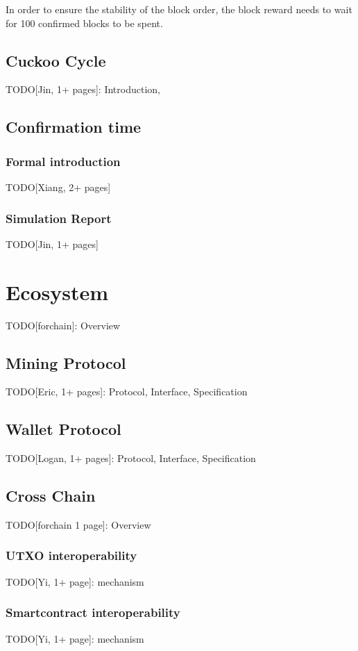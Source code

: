 \documentclass[a4paper,11pt]{article}
\begin{document}
In order to ensure the stability of the block order, the block reward needs to wait for 100 confirmed blocks to be spent.

\subsection{Cuckoo Cycle}
TODO[Jin, 1+ pages]: Introduction, 

\subsection{Confirmation time}
\subsubsection{Formal introduction}
TODO[Xiang, 2+ pages]
\subsubsection{Simulation Report}
TODO[Jin, 1+ pages]

\section{Ecosystem}
TODO[forchain]: Overview

\subsection{Mining Protocol}
TODO[Eric, 1+ pages]: Protocol, Interface, Specification

\subsection{Wallet Protocol}
TODO[Logan, 1+ pages]: Protocol, Interface, Specification

\subsection{Cross Chain}
TODO[forchain 1 page]: Overview

\subsubsection{UTXO interoperability}
TODO[Yi, 1+ page]:  mechanism

\subsubsection{Smartcontract interoperability}
TODO[Yi, 1+ page]: mechanism
\end{document}
